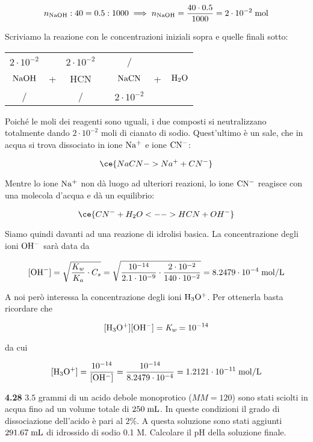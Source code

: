 $$n_{\rm NaOH}:40=0.5:1000
\implies
n_{\rm NaOH}=\frac{40 \cdot 0.5}{1000}=2 \cdot 10^{-2} \; \rm mol$$

Scriviamo la reazione con le concentrazioni iniziali sopra e quelle finali sotto:

\begin{center}
    \begin{tabular}{ccccccc}
        $2 \cdot 10^{-2}$ &  & $2 \cdot 10^{-2}$ & & / &&\\
        $\rm NaOH$ & + & HCN & \ce{->} & $\rm NaCN$ & + & $\rm H_2O$\\
        / &  &  / & & $2 \cdot 10^{-2}$ &&\\
    \end{tabular}
\end{center}

Poiché le moli dei reagenti sono uguali, i due composti si neutralizzano totalmente dando $2 \cdot 10^{-2}$ moli di cianato di sodio. Quest'ultimo è un sale, che in acqua si trova dissociato in ione $\rm Na^+$ e ione $\rm CN^-$:

$$\ce{NaCN -> Na^+ + CN^-}$$

Mentre lo ione $\rm Na^+$ non dà luogo ad ulteriori reazioni, lo ione $\rm CN^-$ reagisce con una molecola d'acqua e dà un equilibrio:

$$\ce{CN^- + H_2O <--> HCN + OH^-}$$

Siamo quindi davanti ad una reazione di idrolisi basica. La concentrazione degli ioni $\rm OH^-$ sarà data da

$$[\text{OH}^-]
=\sqrt{\frac{K_w}{K_a}\cdot C_s}
=\sqrt{\frac{10^{-14}}{2.1 \cdot 10^{-9}} \cdot \frac{2 \cdot 10^{-2}}{140 \cdot 10^{-2}}}
=8.2479 \cdot 10^{-4} \; \rm mol/L$$

A noi però interessa la concentrazione degli ioni $\rm H_3O^+$. Per ottenerla basta ricordare che

$$\rm [H_3O^+][OH^-]=\textit{K}_{\textit{w}}=10^{-14}$$

da cui

$$\rm [H_3O^+]
=\frac{10^{-14}}{[OH^-]}
=\frac{10^{-14}}{8.2479 \cdot 10^{-4}}=1.2121 \cdot 10^{-11} \; \rm mol/L$$

\vspace{0.2cm}\textbf{4.28} $3.5$ grammi di un acido debole monoprotico ($MM=120$) sono stati sciolti in acqua fino ad un volume totale di $250 \; \rm mL$. In queste condizioni il grado di dissociazione dell'acido è pari al $2\%$. A questa soluzione sono stati aggiunti $291.67 \; \rm mL$ di idrossido di sodio 0.1 M. Calcolare il pH della soluzione finale.

